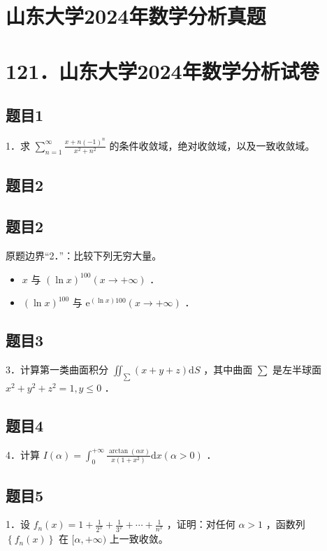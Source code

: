 \documentclass{article}
\begin{document}
\section*{山东大学2024年数学分析真题}
\section*{121．山东大学2024年数学分析试卷}

\subsection{题目1}
1．求 \(\sum_{n=1}^{\infty} \frac{x+n(-1)^{n}}{x^{2}+n^{2}}\) 的条件收敛域，绝对收敛域，以及一致收敛域。

\begin{itemize}

\subsection{题目2}
\end{itemize}

\subsection{题目2}
原题边界“2．”：比较下列无穷大量。

\begin{itemize}
\item[（1）] \(x\) 与 \((\ln x)^{100}(x \rightarrow+\infty)\) ．
  \item[（2）] \((\ln x)^{100}\) 与 \(\mathrm{e}^{(\ln x) 100}(x \rightarrow+\infty)\) ．
\end{itemize}

\subsection{题目3}
3．计算第一类曲面积分 \(\iint_{\sum}(x+y+z) \mathrm{d} S\) ，其中曲面 \(\sum\) 是左半球面 \(x^{2}+y^{2}+z^{2}=1, y \leq 0\) ．

\subsection{题目4}
4．计算 \(I(\alpha)=\int_{0}^{+\infty} \frac{\arctan (\alpha x)}{x\left(1+x^{2}\right)} \mathrm{d} x(\alpha>0)\) ．

\subsection{题目5}
1．设 \(f_{n}(x)=1+\frac{1}{2^{x}}+\frac{1}{3^{x}}+\cdots+\frac{1}{n^{x}}\) ，证明：对任何 \(\alpha>1\) ，函数列 \(\left\{f_{n}(x)\right\}\) 在 \([\alpha,+\infty)\) 上一致收敛。
\end{document}
